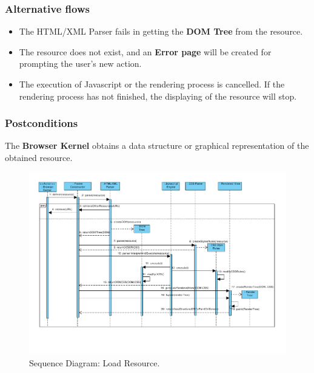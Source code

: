 \documentclass[]{acmlarge}
\begin{document}
    \subsubsection*{Alternative flows} 
    \begin{itemize}\leftskip2.2em
    \item The HTML/XML Parser fails in getting the \textbf{DOM Tree} from the resource.
    \item The resource does not exist, and an \textbf{Error page} will be created for prompting the user's new action.
    \item The execution of Javascript or the rendering process is cancelled. If the rendering process has not finished, the displaying of the resource will stop.
      \end{itemize}
    \subsubsection*{Postconditions} The \textbf{Browser Kernel} obtains a data structure or graphical representation of the obtained resource.


    \begin{landscape}
      \begin{figure}[h!t]
          \centering
          \hspace*{-1cm}\includegraphics[scale=0.78]{figures/LoadResource-v4.pdf}
          \vspace*{-2.2cm}
          \caption{Sequence Diagram: Load Resource.}
          \label{fig:LoadResource}
      \end{figure}
    \end{landscape}
\end{document}
